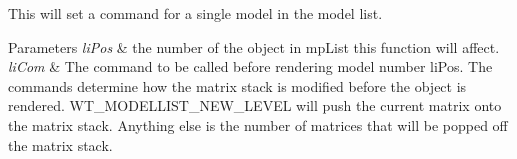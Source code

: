 This will set a command for a single model in the model list. 


\begin{DoxyParams}{Parameters}
{\em liPos} & the number of the object in mpList this function will affect. \\
\hline
{\em liCom} & The command to be called before rendering model number liPos. The commands determine how the matrix stack is modified before the object is rendered. WT\_\-MODELLIST\_\-NEW\_\-LEVEL will push the current matrix onto the matrix stack. Anything else is the number of matrices that will be popped off the matrix stack. \\
\hline
\end{DoxyParams}
